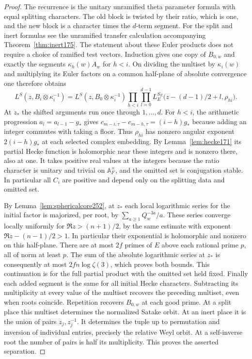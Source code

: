 \documentclass[a4paper,11pt]{article}
\theoremstyle{definition}
\theoremstyle{remark}
\numberwithin{equation}{section}
\begin{document}
\begin{proof}
The recurrence is the unitary unramified theta parameter formula with
equal splitting characters. The old block is twisted by their ratio,
which is one, and the new block is a character times the \(d\)-term
segment. For the split and inert formulas see the unramified transfer
calculation accompanying Theorem~\ref{thm:inert175}. The statement
about these Euler products does not require a choice of ramified test
vectors. Induction gives one copy of \(B_{0,w}\) and exactly the segments
\(\kappa_h(w)A_w\) for \(h<i\). On dividing the multiset by \(\kappa_i(w)\)
and multiplying its Euler factors on a common half-plane of absolute
convergence one therefore obtains
\[
 L^S(z,B_i\otimes\kappa_i^{-1})
 =L^S(z,B_0\otimes\kappa_i^{-1})
   \prod_{h<i}\prod_{l=0}^{d-1}
        L_E^{S_E}\bigl(z-(d-1)/2+l,\rho_{hi}\bigr) .
\]
At \(z_*\) the shifted arguments run once through \(1,\ldots,d\).
For \(h<i\), the arithmetic progression \(a_l=a_{l-1}-g_*\) gives
\(c_{m-i,\tau}-c_{m-h,\tau}=(i-h)g_*\) because adding an integer commutes
with taking a floor. Thus \(\rho_{hi}\) has nonzero angular exponent
\(2(i-h)g_*\) at each selected complex embedding. By
Lemma~\ref{lem:hecke171} its partial Hecke function is holomorphic
near these integers and is nonzero there, also at one. It takes
positive real values at the integers because the ratio character is
unitary and trivial on \(\mathbb A_F^\times\), and the omitted set is
conjugation stable. In particular all \(C_i\) are positive and depend
only on the splitting data and omitted set.

By Lemma~\ref{lem:sphericalcore252}, at \(z_*\) each local logarithmic
series for the initial factor is majorized, per root, by
\(\sum_{a\ge1} Q_w^{-3a}/a\). These series converge locally uniformly
for \(\Re z>(n+1)/2\), by the same estimate with exponent
\(\Re z-(n-1)/2>1\). In particular their exponential is holomorphic
and nonzero on this half-plane. There are at most \(2f\) primes of
\(E\) above each rational prime \(p\), all of norm at least \(p\).
The sum of the absolute logarithmic series at \(z_*\) is consequently
at most \(2fn\log\zeta(3)\), which proves both bounds. This continuation
is for the full partial product with the omitted set held fixed.
Finally each added segment is the same for all initial Hecke characters.
Subtracting its multiplicity at every value of the multiset recovers
the preceding multiset, even when roots coincide. Repetition recovers
\(B_{0,w}\) at each good prime. At a split place this multiset determines
the normalized Satake orbit. At an inert place it is the union of pairs
\(z_j,z_j^{-1}\). It determines the tuple up to permutation and inversion
of individual entries, precisely the relative Weyl orbit. At a
self-inverse root the number of pairs is half its multiplicity. This proves
the asserted separation.
\end{proof}
\end{document}
